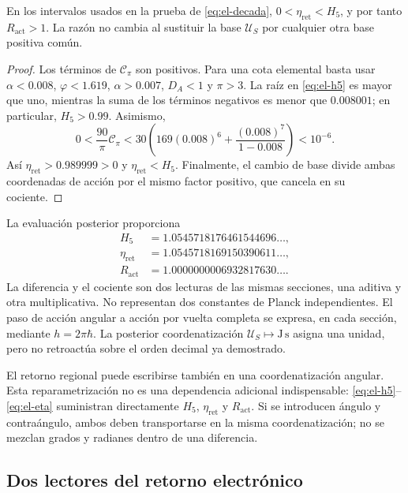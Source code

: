 \begin{proposition}
En los intervalos usados en la prueba de \eqref{eq:el-decada},
\(0<\eta_{\mathrm{ret}}<H_5\), y por tanto
\(R_{\mathrm{act}}>1\). La razón no cambia al sustituir la base
\(\mathcal U_S\) por cualquier otra base positiva común.
\end{proposition}
\begin{proof}
Los términos de \(\mathcal C_\pi\) son positivos. Para una cota
elemental basta usar \(\alpha<0.008\), \(\varphi<1.619\),
\(\alpha>0.007\), \(D_A<1\) y \(\pi>3\). La raíz en
\eqref{eq:el-h5} es mayor que uno, mientras la suma de los términos
negativos es menor que \(0.008001\); en particular, \(H_5>0.99\).
Asimismo,
\[
 0<\frac{90}{\pi}\mathcal C_\pi
 <30\left(169(0.008)^6+
           \frac{(0.008)^7}{1-0.008}\right)<10^{-6}.
\]
Así \(\eta_{\mathrm{ret}}>0.989999>0\) y
\(\eta_{\mathrm{ret}}<H_5\). Finalmente, el cambio de base divide
ambas coordenadas de acción por el mismo factor positivo, que cancela en
su cociente.
\end{proof}

La evaluación posterior proporciona
\begin{align*}
 H_5&=1.0545718176461544696\ldots,\\
 \eta_{\mathrm{ret}}&=1.0545718169150390611\ldots,\\
 R_{\mathrm{act}}&=1.0000000006932817630\ldots.
\end{align*}
La diferencia y el cociente son dos lecturas de las mismas secciones,
una aditiva y otra multiplicativa. No representan dos constantes de
Planck independientes. El paso de acción angular a acción por vuelta
completa se expresa, en cada sección, mediante
\(h=2\pi\hbar\). La posterior coordenatización
\(\mathcal U_S\mapsto\mathrm{J\,s}\) asigna una unidad, pero no
retroactúa sobre el orden decimal ya demostrado.

El retorno regional puede escribirse también en una coordenatización angular.
Esta reparametrización no es una dependencia adicional indispensable:
\eqref{eq:el-h5}--\eqref{eq:el-eta} suministran directamente
\(H_5\), \(\eta_{\mathrm{ret}}\) y \(R_{\mathrm{act}}\). Si se
introducen ángulo y contraángulo, ambos deben transportarse en la misma
coordenatización; no se mezclan grados y radianes dentro de una diferencia.



\subsection{Dos lectores del retorno electrónico}

